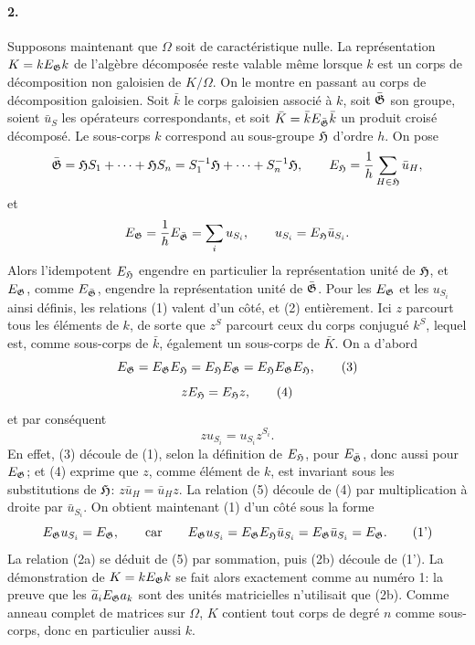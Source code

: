 \paragraph{2.}
Supposons maintenant que \(\Omega\) soit de caractéristique nulle. La représentation \(K=kE_\mathfrak G k\) de l'algèbre décomposée reste valable même lorsque \(k\) est un corps de décomposition non galoisien de \(K/\Omega\). On le montre en passant au corps de décomposition galoisien. Soit \(\bar k\) le corps galoisien associé à \(k\), soit \(\bar{\mathfrak G}\) son groupe, soient \(\bar u_S\) les opérateurs correspondants, et soit \(\bar K=\bar kE_{\bar{\mathfrak G}}\bar k\) un produit croisé décomposé. Le sous-corps \(k\) correspond au sous-groupe \(\mathfrak H\) d'ordre \(h\). On pose
\[
        \bar{\mathfrak G}=\mathfrak H S_1+\cdots+\mathfrak H S_n
              =S_1^{-1}\mathfrak H+\cdots+S_n^{-1}\mathfrak H,
        \qquad
        E_\mathfrak H=\frac1h\sum_{H\in\mathfrak H}\bar u_H,
\]
et
\[
        E_\mathfrak G=\frac1h E_{\bar{\mathfrak G}}
              =\sum_i u_{S_i},\qquad
        u_{S_i}=E_\mathfrak H\bar u_{S_i}.
\]
Alors l'idempotent \(E_\mathfrak H\) engendre en particulier la représentation unité de \(\mathfrak H\), et \(E_\mathfrak G\), comme \(E_{\bar{\mathfrak G}}\), engendre la représentation unité de \(\bar{\mathfrak G}\). Pour les \(E_\mathfrak G\) et les \(u_{S_i}\) ainsi définis, les relations (1) valent d'un côté, et (2) entièrement. Ici \(z\) parcourt tous les éléments de \(k\), de sorte que \(z^S\) parcourt ceux du corps conjugué \(k^S\), lequel est, comme sous-corps de \(\bar k\), également un sous-corps de \(\bar K\). On a d'abord
\[
        E_\mathfrak G=E_\mathfrak G E_\mathfrak H=E_\mathfrak H E_\mathfrak G=E_\mathfrak H E_\mathfrak G E_\mathfrak H,       \tag{3}
\]
\[
        zE_\mathfrak H=E_\mathfrak H z,                                      \tag{4}
\]
et par conséquent
\[
        z u_{S_i}=u_{S_i}z^{S_i}.                            \tag{5}
\]
En effet, (3) découle de (1), selon la définition de \(E_\mathfrak H\), pour \(E_{\bar{\mathfrak G}}\), donc aussi pour \(E_\mathfrak G\); et (4) exprime que \(z\), comme élément de \(k\), est invariant sous les substitutions de \(\mathfrak H\): \(z\bar u_H=\bar u_Hz\). La relation (5) découle de (4) par multiplication à droite par \(\bar u_{S_i}\). On obtient maintenant (1) d'un côté sous la forme
\[
        E_\mathfrak G u_{S_i}=E_\mathfrak G,
        \qquad\text{car}\qquad
        E_\mathfrak G u_{S_i}=E_\mathfrak G E_\mathfrak H\bar u_{S_i}
        =E_\mathfrak G\bar u_{S_i}=E_\mathfrak G .                         \tag{1'}
\]
La relation (2a) se déduit de (5) par sommation, puis (2b) découle de (1'). La démonstration de \(K=kE_\mathfrak G k\) se fait alors exactement comme au numéro 1: la preuve que les \(\widetilde a_iE_\mathfrak G a_k\) sont des unités matricielles n'utilisait que (2b). Comme anneau complet de matrices sur \(\Omega\), \(K\) contient tout corps de degré \(n\) comme sous-corps, donc en particulier aussi \(k\).

